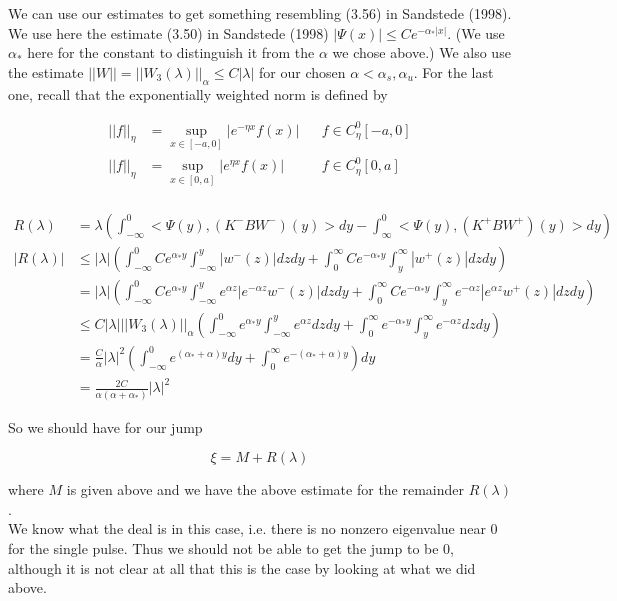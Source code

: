 \documentclass[12pt]{article}
\begin{document}
We can use our estimates to get something resembling (3.56) in Sandstede (1998). We use here the estimate (3.50) in Sandstede (1998) $|\Psi(x)| \leq C e^{-\alpha_* |x|}$. (We use $\alpha_*$ here for the constant to distinguish it from the $\alpha$ we chose above.) We also use the estimate $||W|| = ||W_3(\lambda)||_\alpha \leq C|\lambda|$ for our chosen $\alpha < \alpha_s, \alpha_u$. For the last one, recall that the exponentially weighted norm is defined by

\begin{align*}
|| f ||_\eta &= \sup_{x \in [-a, 0]} |e^{-\eta x} f(x) | && f \in C^0_\eta[-a, 0] \\
|| f ||_\eta &= \sup_{x \in [0, a]} |e^{\eta x} f(x) | && f \in C^0_\eta[0, a] \\
\end{align*}

\begin{align*}
R(\lambda) &= \lambda\left( \int_{-\infty}^0 < \Psi(y), (K^- B W^-)(y) > dy - \int_\infty^0 < \Psi(y), (K^+ B W^+)(y)> dy \right) \\
|R(\lambda)| &\leq |\lambda|\left( \int_{-\infty}^0 C e^{\alpha_* y} \int_{-\infty}^y |w^-(z)| dz dy + \int_0^\infty C e^{-\alpha_* y} \int_y^\infty |w^+(z)| dz dy \right) \\
&= |\lambda|\left( \int_{-\infty}^0 C e^{\alpha_* y} \int_{-\infty}^y e^{\alpha z} |e^{-\alpha z} w^-(z)| dz dy + \int_0^\infty C e^{-\alpha_* y} \int_y^\infty e^{-\alpha z} |e^{\alpha z}w^+(z)| dz dy \right)\\
&\leq C |\lambda| ||W_3(\lambda)||_\alpha \left( \int_{-\infty}^0 e^{\alpha_* y} \int_{-\infty}^y e^{\alpha z} dz dy + \int_0^\infty e^{-\alpha_* y} \int_y^\infty e^{-\alpha z} dz dy \right)\\
&= \frac{C}{\alpha} |\lambda|^2 \left( \int_{-\infty}^0 e^{(\alpha_* + \alpha) y} dy + \int_0^\infty e^{-(\alpha_* + \alpha) y} \right) dy \\
&= \frac{2 C}{\alpha(\alpha + \alpha_*)} |\lambda|^2 
\end{align*}

So we should have for our jump

\[
\xi = M + R(\lambda)
\]

where $M$ is given above and we have the above estimate for the remainder $R(\lambda)$.\\

We know what the deal is in this case, i.e. there is no nonzero eigenvalue near 0 for the single pulse. Thus we should not be able to get the jump to be 0, although it is not clear at all that this is the case by looking at what we did above.
\end{document}
